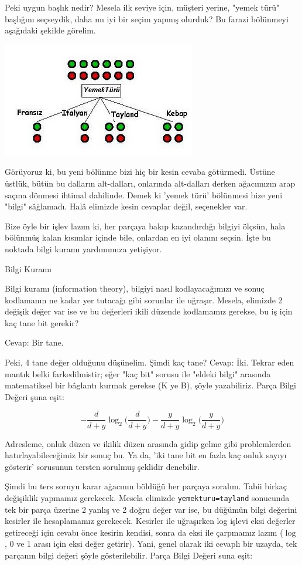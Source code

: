 \documentclass[12pt,fleqn]{article}\usepackage{../../common}
\begin{document}
Peki uygun başlık nedir? Mesela ilk seviye için, müşteri yerine, "yemek
türü" başlığını seçseydik, daha mı iyi bir seçim yapmış olurduk? Bu farazi
bölünmeyi aşağıdaki şekilde görelim.

\includegraphics[height=5cm]{id3_hangi_baslik_2.jpg}

Görüyoruz ki, bu yeni bölünme bizi hiç bir kesin cevaba götürmedi. Üstüne
üstlük, bütün bu dalların alt-dalları, onlarında alt-dalları derken
ağacımızın arap saçına dönmesi ihtimal dahilinde. Demek ki 'yemek türü'
bölünmesi bize yeni "bilgi" sâğlamadı. Halâ elimizde kesin cevaplar değil,
seçenekler var.

Bize öyle bir işlev lazım ki, her parçaya bakıp kazandırdığı bilgiyi
ölçsün, hala bölünmüş kalan kısımlar içinde bile, onlardan en iyi olanını
seçsin. İşte bu noktada bilgi kuramı yardımımıza yetişiyor.

Bilgi Kuramı

Bilgi kuramı (information theory), bilgiyi nasıl kodlayacağımızı ve sonuç
kodlamanın ne kadar yer tutacağı gibi sorunlar ile uğraşır. Mesela,
elimizde 2 değişik değer var ise ve bu değerleri ikili düzende kodlamamız
gerekse, bu iş için kaç tane bit gerekir?

Cevap: Bir tane.

Peki, 4 tane değer olduğunu düşünelim. Şimdi kaç tane? Cevap: İki. Tekrar
eden mantık belki farkedilmistir; eğer "kaç bit" sorusu ile "eldeki
bilgi" arasında matematiksel bir bâglantı kurmak gerekse (K ye B), şöyle
yazabiliriz. Parça Bilgi Değeri şuna eşit:

$$ -\frac{d}{d+y} \log_2 \bigg( \frac{d}{d+y} \bigg) - 
\frac{y}{d+y} \log_2 \bigg( \frac{y}{d+y} \bigg) 
$$

Adresleme, onluk düzen ve ikilik düzen arasında gidip gelme gibi
problemlerden hatırlayabileceğimiz bir sonuç bu. Ya da, 'iki tane bit en
fazla kaç onluk sayıyı gösterir' sorusunun tersten sorulmuş şeklidir
denebilir.

Şimdi bu ters soruyu karar ağacının böldüğü her parçaya soralım. Tabii
birkaç değişiklik yapmamız gerekecek. Mesela elimizde
\verb!yemekturu=tayland! sonucunda tek bir parça üzerine 2 yanlış ve 2
doğru değer var ise, bu düğümün bilgi değerini kesirler ile hesaplamamız
gerekecek. Kesirler ile uğraşırken log işlevi eksi değerler getireceği için
cevabı önce kesirin kendisi, sonra da eksi ile çarpmamız lazım ($\log$, 0
ve 1 arası için eksi değer getirir). Yani, genel olarak iki cevaplı bir
uzayda, tek parçanın bilgi değeri şöyle gösterilebilir. Parça Bilgi Değeri
suna eşit:
\end{document}
